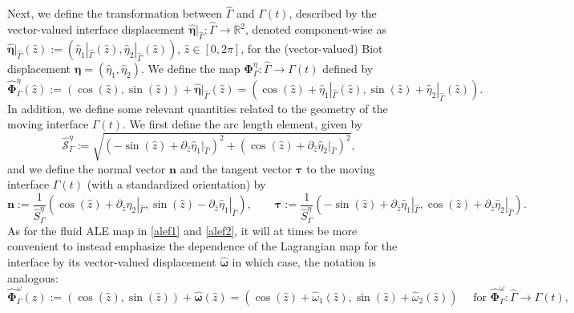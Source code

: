 \documentclass[11pt]{article}
\newcommand{\bd}{\boldsymbol}
\def\R{{\mathbb R}}
\theoremstyle{definition}
\begin{document}
Next, we define the transformation between $\hat{\Gamma}$ and $\Gamma(t)$, described by the vector-valued interface displacement $\hat{\bd{\eta}}|_{\hat{\Gamma}}: \hat{\Gamma} \to \R^{2}$, denoted component-wise as $\hat{\bd{\eta}}|_{\hat{\Gamma}}(\hat{z}) := (\hat{\eta}_{1}|_{\hat{\Gamma}}(\hat{z}), \hat{\eta}_{2}|_{\hat{\Gamma}}(\hat{z}))$, $\hat{z} \in [0, 2\pi]$, for the (vector-valued) Biot displacement $\hat{\bd{\eta}} = (\hat{\eta}_{1}, \hat{\eta}_{2})$. We define the map $\bd{\Phi}^{\eta}_{\Gamma}: \hat{\Gamma} \to \Gamma(t)$ defined by
\begin{equation}\label{inteta}
\hat{\bd{\Phi}}^{\eta}_{\Gamma}(\hat{z}) := (\cos(\hat{z}), \sin(\hat{z})) + \hat{\bd{\eta}}|_{\hat{\Gamma}}(\hat{z}) = (\cos(\hat{z}) + \hat{\eta}_{1}|_{\hat{\Gamma}}(\hat{z}), \sin(\hat{z}) + \hat{\eta}_{2}|_{\hat{\Gamma}}(\hat{z})). 
\end{equation}
In addition, we define some relevant quantities related to the geometry of the moving interface $\Gamma(t)$. We first define the arc length element, given by
\begin{equation}\label{arclengthdef}
\hat{\mathcal{S}}^{\eta}_{\Gamma} := \sqrt{(-\sin(\hat{z}) + \partial_{\hat{z}}\hat{\eta}_{1}|_{\hat{\Gamma}})^{2} + (\cos(\hat{z}) + \partial_{\hat{z}}\hat{\eta}_{2}|_{\hat{\Gamma}})^{2}},
\end{equation}
and we define the normal vector $\bd{n}$ and the tangent vector $\bd{\tau}$ to the moving interface $\Gamma(t)$ (with a standardized orientation) by
\begin{equation}\label{ntdef}
\bd{n} := \frac{1}{\hat{S}^{\eta}_{\Gamma}} (\cos(\hat{z}) + \partial_{\hat{z}}\hat{\eta}_{2}|_{\hat{\Gamma}}, \sin(\hat{z}) - \partial_{\hat{z}}\hat{\eta}_{1}|_{\hat{\Gamma}}), \qquad \bd{\tau} := \frac{1}{\hat{S}^{\eta}_{\Gamma}} (-\sin(\hat{z}) + \partial_{\hat{z}}\hat{\eta}_{1}|_{\hat{\Gamma}}, \cos(\hat{z}) + \partial_{\hat{z}}\hat{\eta}_{2}|_{\hat{\Gamma}}).
\end{equation}
As for the fluid ALE map in \eqref{alef1} and \eqref{alef2}, it will at times be more convenient to instead emphasize the dependence of the Lagrangian map for the interface by its vector-valued displacement $\hat{\bd{\omega}}$ in which case, the notation is analogous:
\begin{equation}\label{intomega}
\hat{\bd{\Phi}}^{\omega}_{\Gamma}(\hat{z}) := (\cos(\hat{z}), \sin(\hat{z})) + \hat{\bd{\omega}}(\hat{z}) = (\cos(\hat{z}) + \hat{\omega}_{1}(\hat{z}), \sin(\hat{z}) + \hat{\omega}_{2}(\hat{z})) \quad \text{ for } \hat{\bd{\Phi}}^{\omega}_{\Gamma}: \hat{\Gamma} \to \Gamma(t),
\end{equation}
\end{document}
